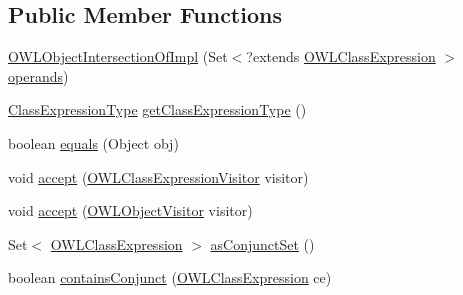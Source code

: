 \subsection*{Public Member Functions}
\begin{DoxyCompactItemize}
\item 
\hyperlink{classuk_1_1ac_1_1manchester_1_1cs_1_1owl_1_1owlapi_1_1_o_w_l_object_intersection_of_impl_a38592bf031939fd9591fdc762d072254}{O\-W\-L\-Object\-Intersection\-Of\-Impl} (Set$<$?extends \hyperlink{interfaceorg_1_1semanticweb_1_1owlapi_1_1model_1_1_o_w_l_class_expression}{O\-W\-L\-Class\-Expression} $>$ \hyperlink{classuk_1_1ac_1_1manchester_1_1cs_1_1owl_1_1owlapi_1_1_o_w_l_nary_boolean_class_expression_impl_af6e58b4bd9107f35125d03637c9dcb0f}{operands})
\item 
\hyperlink{enumorg_1_1semanticweb_1_1owlapi_1_1model_1_1_class_expression_type}{Class\-Expression\-Type} \hyperlink{classuk_1_1ac_1_1manchester_1_1cs_1_1owl_1_1owlapi_1_1_o_w_l_object_intersection_of_impl_a50c17ec48292dc7e211a96351403d11e}{get\-Class\-Expression\-Type} ()
\item 
boolean \hyperlink{classuk_1_1ac_1_1manchester_1_1cs_1_1owl_1_1owlapi_1_1_o_w_l_object_intersection_of_impl_af75652dfaf1078f3f4c63382c25c762e}{equals} (Object obj)
\item 
void \hyperlink{classuk_1_1ac_1_1manchester_1_1cs_1_1owl_1_1owlapi_1_1_o_w_l_object_intersection_of_impl_aadc0a22be872aa73e18e32118e67f361}{accept} (\hyperlink{interfaceorg_1_1semanticweb_1_1owlapi_1_1model_1_1_o_w_l_class_expression_visitor}{O\-W\-L\-Class\-Expression\-Visitor} visitor)
\item 
void \hyperlink{classuk_1_1ac_1_1manchester_1_1cs_1_1owl_1_1owlapi_1_1_o_w_l_object_intersection_of_impl_aa0617be85825db2f65ab14c56b0b964e}{accept} (\hyperlink{interfaceorg_1_1semanticweb_1_1owlapi_1_1model_1_1_o_w_l_object_visitor}{O\-W\-L\-Object\-Visitor} visitor)
\item 
Set$<$ \hyperlink{interfaceorg_1_1semanticweb_1_1owlapi_1_1model_1_1_o_w_l_class_expression}{O\-W\-L\-Class\-Expression} $>$ \hyperlink{classuk_1_1ac_1_1manchester_1_1cs_1_1owl_1_1owlapi_1_1_o_w_l_object_intersection_of_impl_a95b5c87f6ae4f0f72918184b4c449225}{as\-Conjunct\-Set} ()
\item 
boolean \hyperlink{classuk_1_1ac_1_1manchester_1_1cs_1_1owl_1_1owlapi_1_1_o_w_l_object_intersection_of_impl_a88b8714defb6822c92ab6f45f6e03aa6}{contains\-Conjunct} (\hyperlink{interfaceorg_1_1semanticweb_1_1owlapi_1_1model_1_1_o_w_l_class_expression}{O\-W\-L\-Class\-Expression} ce)
\end{DoxyCompactItemize}
